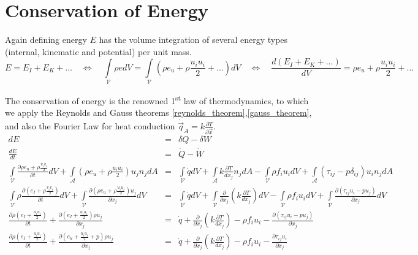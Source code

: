 
\section{Conservation of Energy}
Again defining energy $E$ has the volume integration of several energy types (internal, kinematic and potential) per unit mass.
\begin{equation}
E= E_I + E_K + \ldots \quad \Leftrightarrow \quad \int\limits_{\mathcal{V}} \rho e dV =  \int\limits_{\mathcal{V}} (\rho e_u+ \rho\frac{u_i u_i}{2} + \ldots) dV \quad  \Leftrightarrow \quad  \frac{d(E_I + E_K + \ldots) }{dV} = \rho e_u+ \rho\frac{u_i u_i}{2} + \ldots  
\end{equation}

The conservation of energy is the renowned 1\textsuperscript{st} law of thermodynamics, to which we apply the Reynolds and Gauss theorems \eqref{reynolds_theorem},\eqref{gauss_theorem}, and also the Fourier Law for heat conduction $\dot{\vec{q}}_A = k\frac{\partial T}{\partial \vec{x}}$.
\begin{eqnarray}
    \label{differential_energy}
    dE &=& \delta Q- \delta W \\
    \frac{dE}{dt} &=& \dot{Q} - \dot{W} \\
    \int\limits_{\mathcal{V}} \frac{\partial \rho e_u+ \rho\frac{v_iv_i}{2}}{\partial t} dV +  \int\limits_{\mathcal{A}} (\rho e_u + \rho\frac{u_i u_i}{2}) u_j n_j dA 
    &=&  \int\limits_{\mathcal{V}} \dot{q} dV + \int\limits_{\mathcal{A}} k\frac{\partial T}{d x_j} n_j dA - \int\limits_{\mathcal{V}} \rho f_i u_i dV + \int\limits_{\mathcal{A}} \left(\tau_{ij}- p \delta_{ij} \right)u_i n_j dA \\
    \int\limits_{\mathcal{V}} \rho \frac{\partial \left( e_I+ \rho\frac{v_iv_i}{2}\right)}{\partial t} dV +  \int\limits_{\mathcal{V}} \frac{\partial \left(\rho e_u+ \rho\frac{u_i u_i}{2}\right) u_j}{\partial x_j} dV 
    &=&  \int\limits_{\mathcal{V}} \dot{q} dV + \int\limits_{\mathcal{V}} \frac{\partial} {\partial x_j} \left( k\frac{\partial T}{d x_j} \right) dV - \int\limits_{\mathcal{V}} \rho f_i u_i dV + \int\limits_{\mathcal{V}} \frac{\partial \left(\tau_{ij}u_i- p u_j \right )}{\partial x_j} dV \\
    \frac{\partial \rho \left( e_I+ \frac{u_i u_i}{2} \right)}{\partial t} +  \frac{\partial \left( e_I + \frac{u_i u_i}{2}\right) \rho u_j}{\partial x_j} 
    &=&  \dot{q} + \frac{\partial} {\partial x_j} \left( k\frac{\partial T}{d x_j} \right) - \rho f_i u_i - \frac{\partial \left(\tau_{ij}u_i- p u_j \right)}{\partial x_j} \\
	\frac{\partial \rho \left( e_I+ \frac{u_i u_i}{2} \right)}{\partial t} +  \frac{\partial \left( e_u + \frac{u_i u_i}{2} + p  \right)\rho u_j}{\partial x_j} 
    &=&  \dot{q} + \frac{\partial} {\partial x_j} \left( k\frac{\partial T}{d x_j} \right) - \rho f_i u_i - \frac{\partial \tau_{ij}u_i}{\partial x_j} 
\end{eqnarray}





